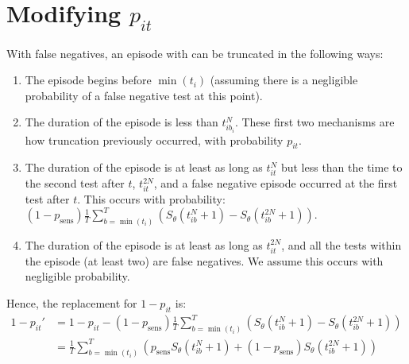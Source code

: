 \documentclass[thesis.tex]{subfiles}
\begin{document}
\section{Modifying $p_{it}$} \label{modifying-p_it}

With false negatives, an episode with can be truncated in the following
ways:

\begin{enumerate}
\item
  The episode begins before $\min(t_i)$ (assuming there is a
  negligible probability of a false negative test at this point).
\item
  The duration of the episode is less than $t_{ib_i}^N$. These first
  two mechanisms are how truncation previously occurred, with
  probability $p_{it}$.
\item
  The duration of the episode is at least as long as $t_{it}^N$ but
  less than the time to the second test after $t$, $t_{it}^{2N}$,
  and a false negative episode occurred at the first test after $t$.
  This occurs with probability:
  \begin{math}
    (1 - p_\text{sens})\frac{1}{T} \sum_{b=\min(t_i)}^T \left( S_\theta(t_{ib}^N + 1) - S_\theta(t_{ib}^{2N} + 1)\right).
  \end{math}
\item
  The duration of the episode is at least as long as $t_{it}^{2N}$,
  and all the tests within the episode (at least two) are false
  negatives. We assume this occurs with negligible probability.
\end{enumerate}

Hence, the replacement for $1 - p_{it}$ is:
\begin{align}
1 - p_{it}'
&= 1 - p_{it} - (1 - p_\text{sens})\frac{1}{T} \sum_{b=\min(t_i)}^T \left( S_\theta(t_{ib}^N + 1) - S_\theta(t_{ib}^{2N} + 1)\right) \\
&= \frac{1}{T} \sum_{b=\min(t_i)}^T \left( p_\text{sens} S_\theta(t_{ib}^N + 1) + (1 - p_\text{sens}) S_\theta(t_{ib}^{2N} + 1)\right) \\
\end{align}
\end{document}

